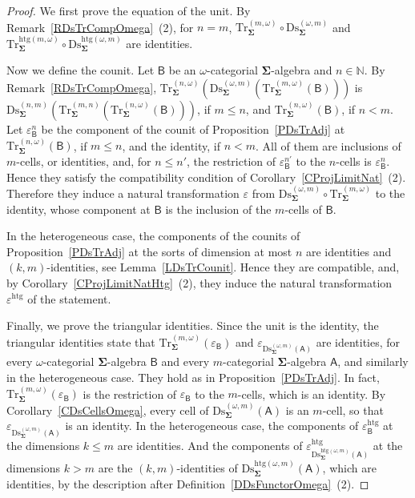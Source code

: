 \documentclass[a4paper, reqno]{amsbook}
\newcommand{\sig}[1]{\mathbf{#1}}             %
\newcommand{\calg}[1]{\boldsymbol{\mathsf{#1}}} %
\newcommand{\htg}{\mathrm{htg}}                %
\newcommand{\Ds}{\mathrm{Ds}}
\newcommand{\Tr}{\mathrm{Tr}}
\theoremstyle{plain}
\theoremstyle{definition}
\begin{document}
\begin{proof}
We first prove the equation of the unit.
By Remark~\ref{RDsTrCompOmega}~(2), for $n=m$, $\Tr^{(m,\omega)}_{\sig{\Sigma}}\circ\Ds^{(\omega,m)}_{\sig{\Sigma}}$ and $\Tr^{\htg(m,\omega)}_{\sig{\Sigma}}\circ\Ds^{\htg(\omega,m)}_{\sig{\Sigma}}$ are identities.

Now we define the counit.
Let $\calg{B}$ be an $\omega$-categorial $\sig{\Sigma}$-algebra and $n\in\mathbb{N}$.
By Remark~\ref{RDsTrCompOmega}, $\Tr^{(n,\omega)}_{\sig{\Sigma}}(\Ds^{(\omega,m)}_{\sig{\Sigma}}(\Tr^{(m,\omega)}_{\sig{\Sigma}}(\calg{B})))$ is $\Ds^{(n,m)}_{\sig{\Sigma}}(\Tr^{(m,n)}_{\sig{\Sigma}}(\Tr^{(n,\omega)}_{\sig{\Sigma}}(\calg{B})))$, if $m\leq n$, and $\Tr^{(n,\omega)}_{\sig{\Sigma}}(\calg{B})$, if $n<m$.
Let $\varepsilon^{n}_{\calg{B}}$ be the component of the counit of Proposition~\ref{PDsTrAdj} at $\Tr^{(n,\omega)}_{\sig{\Sigma}}(\calg{B})$, if $m\leq n$, and the identity, if $n<m$.
All of them are inclusions of $m$-cells, or identities, and, for $n\leq n'$, the restriction of $\varepsilon^{n'}_{\calg{B}}$ to the $n$-cells is $\varepsilon^{n}_{\calg{B}}$.
Hence they satisfy the compatibility condition of Corollary~\ref{CProjLimitNat}~(2).
Therefore they induce a natural transformation $\varepsilon$ from $\Ds^{(\omega,m)}_{\sig{\Sigma}}\circ\Tr^{(m,\omega)}_{\sig{\Sigma}}$ to the identity, whose component at $\calg{B}$ is the inclusion of the $m$-cells of $\calg{B}$.

In the heterogeneous case, the components of the counits of Proposition~\ref{PDsTrAdj} at the sorts of dimension at most $n$ are identities and $(k,m)$-identities, see Lemma~\ref{LDsTrCounit}.
Hence they are compatible, and, by Corollary~\ref{CProjLimitNatHtg}~(2), they induce the natural transformation $\varepsilon^{\htg}$ of the statement.

Finally, we prove the triangular identities.
Since the unit is the identity, the triangular identities state that $\Tr^{(m,\omega)}_{\sig{\Sigma}}(\varepsilon_{\calg{B}})$ and $\varepsilon_{\Ds^{(\omega,m)}_{\sig{\Sigma}}(\calg{A})}$ are identities, for every $\omega$-categorial $\sig{\Sigma}$-algebra $\calg{B}$ and every $m$-categorial $\sig{\Sigma}$-algebra $\calg{A}$, and similarly in the heterogeneous case.
They hold as in Proposition~\ref{PDsTrAdj}.
In fact, $\Tr^{(m,\omega)}_{\sig{\Sigma}}(\varepsilon_{\calg{B}})$ is the restriction of $\varepsilon_{\calg{B}}$ to the $m$-cells, which is an identity.
By Corollary~\ref{CDsCellsOmega}, every cell of $\Ds^{(\omega,m)}_{\sig{\Sigma}}(\calg{A})$ is an $m$-cell, so that $\varepsilon_{\Ds^{(\omega,m)}_{\sig{\Sigma}}(\calg{A})}$ is an identity.
In the heterogeneous case, the components of $\varepsilon^{\htg}_{\calg{B}}$ at the dimensions $k\leq m$ are identities.
And the components of $\varepsilon^{\htg}_{\Ds^{\htg(\omega,m)}_{\sig{\Sigma}}(\calg{A})}$ at the dimensions $k>m$ are the $(k,m)$-identities of $\Ds^{\htg(\omega,m)}_{\sig{\Sigma}}(\calg{A})$, which are identities, by the description after Definition~\ref{DDsFunctorOmega}~(2).
\end{proof}
\end{document}
